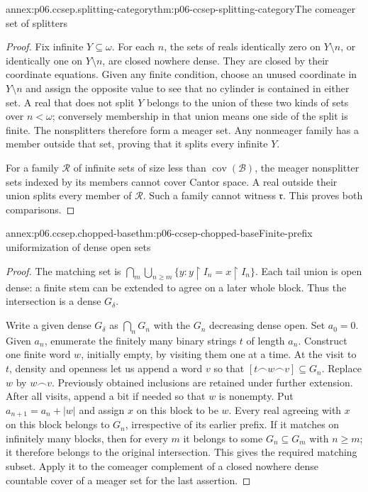 \begin{annexitem}{annex:p06.ccsep.splitting-category}{thm:p06-ccsep-splitting-category}{The comeager set of splitters}
\begin{proof}
Fix infinite \(Y\subseteq\omega\). For each \(n\), the sets of
reals identically zero on \(Y\setminus n\), or identically one on
\(Y\setminus n\), are closed nowhere dense. They are closed by
their coordinate equations. Given any finite condition, choose an
unused coordinate in \(Y\setminus n\) and assign the opposite value
to see that no cylinder is contained in either set. A real that does
not split \(Y\) belongs to the union of these two kinds of sets
over \(n<\omega\); conversely membership in that union means
one side of the split is finite. The nonsplitters therefore form a
meager set. Any nonmeager family has a member outside that set,
proving that it splits every infinite \(Y\).

For a family \(\mathcal R\) of infinite sets of size less than
\(\operatorname{cov}(\mathcal B)\), the meager nonsplitter sets
indexed by its members cannot cover Cantor space. A real outside
their union splits every member of \(\mathcal R\). Such a family
cannot witness \(\mathfrak r\). This proves both comparisons.
\end{proof}
\end{annexitem}

\begin{annexitem}{annex:p06.ccsep.chopped-base}{thm:p06-ccsep-chopped-base}{Finite-prefix uniformization of dense open sets}
\begin{proof}
The matching set is
\(\bigcap_m\bigcup_{n\geq m}\{y:y\mathbin{\upharpoonright}I_n
=x\mathbin{\upharpoonright}I_n\}\). Each tail union is open
dense: a finite stem can be extended to agree on a later whole
block. Thus the intersection is a dense \(G_\delta\).

Write a given dense \(G_\delta\) as \(\bigcap_nG_n\) with the
\(G_n\) decreasing dense open. Set \(a_0=0\). Given \(a_n\),
enumerate the finitely many binary strings \(t\) of length \(a_n\).
Construct one finite word \(w\), initially empty, by visiting them
one at a time. At the visit to \(t\), density and openness let
us append a word \(v\) so that \([t\frown w\frown v]\subseteq G_n\).
Replace \(w\) by \(w\frown v\). Previously obtained inclusions
are retained under further extension. After all visits, append a
bit if needed so that \(w\) is nonempty. Put
\(a_{n+1}=a_n+|w|\) and assign \(x\) on this block to be \(w\).
Every real agreeing with \(x\) on this block belongs to \(G_n\),
irrespective of its earlier prefix. If it matches on infinitely
many blocks, then for every \(m\) it belongs to some
\(G_n\subseteq G_m\) with \(n\geq m\); it therefore belongs
to the original intersection. This gives the required matching
subset. Apply it to the comeager complement of a closed nowhere
dense countable cover of a meager set for the last assertion.
\end{proof}
\end{annexitem}


